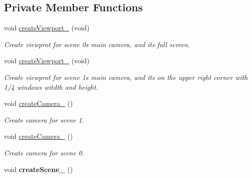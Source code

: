 \subsection*{Private Member Functions}
\begin{DoxyCompactItemize}
\item 
void \hyperlink{class_basic_tutorial__00_a6d4684502f2f7b2cf628a975d7750d8e}{create\+Viewport\+\_} (void)\hypertarget{class_basic_tutorial__00_a6d4684502f2f7b2cf628a975d7750d8e}{}\label{class_basic_tutorial__00_a6d4684502f2f7b2cf628a975d7750d8e}

\begin{DoxyCompactList}\small\item\em Create viewprot for scene 0\textquotesingle{}s main camera, and it\textquotesingle{}s full screen. \end{DoxyCompactList}\item 
void \hyperlink{class_basic_tutorial__00_a2801a2f0d91d80b471da48344d2ccccf}{create\+Viewport\+\_} (void)\hypertarget{class_basic_tutorial__00_a2801a2f0d91d80b471da48344d2ccccf}{}\label{class_basic_tutorial__00_a2801a2f0d91d80b471da48344d2ccccf}

\begin{DoxyCompactList}\small\item\em Create viewprot for scene 1\textquotesingle{}s main camera, and it\textquotesingle{}s on the upper right corner with 1/4 windows witdth and height. \end{DoxyCompactList}\item 
void \hyperlink{class_basic_tutorial__00_a3479c50dbf8dc06a7ea77014eb94c6e7}{create\+Camera\+\_} ()\hypertarget{class_basic_tutorial__00_a3479c50dbf8dc06a7ea77014eb94c6e7}{}\label{class_basic_tutorial__00_a3479c50dbf8dc06a7ea77014eb94c6e7}

\begin{DoxyCompactList}\small\item\em Create camera for scene 1. \end{DoxyCompactList}\item 
void \hyperlink{class_basic_tutorial__00_a8745a127adeb69fa769f832fd41412c0}{create\+Camera\+\_} ()\hypertarget{class_basic_tutorial__00_a8745a127adeb69fa769f832fd41412c0}{}\label{class_basic_tutorial__00_a8745a127adeb69fa769f832fd41412c0}

\begin{DoxyCompactList}\small\item\em Create camera for scene 0. \end{DoxyCompactList}\item 
void {\bfseries create\+Scene\+\_} ()\hypertarget{class_basic_tutorial__00_aa84173e509858146cbfb98274c1ef56e}{}\label{class_basic_tutorial__00_aa84173e509858146cbfb98274c1ef56e}


\end{DoxyCompactItemize}
